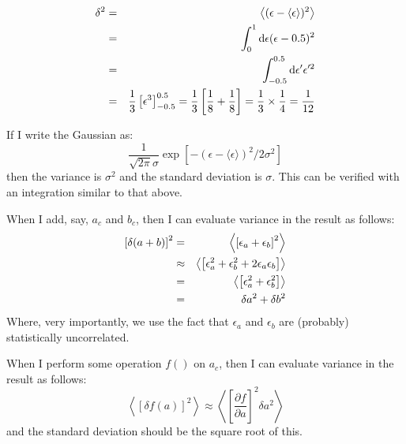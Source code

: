 
\begin{answer}
  \begin{eqnarray}
    \delta^2 &=& \left\langle (\epsilon - \langle\epsilon\rangle)^2
    \right\rangle \cr
    &=& \int_0^1 {\rm d}\epsilon  (\epsilon - 0.5)^2 \cr
    &=& \int_{-0.5}^{0.5} {\rm d}\epsilon'  \epsilon'^2 \cr
    &=& \frac{1}{3}\left[\epsilon^3\right]^{0.5}_{-0.5}
      = \frac{1}{3}\left[\frac{1}{8} + \frac{1}{8}\right]
        = \frac{1}{3} \times \frac{1}{4} = \frac{1}{12}
  \end{eqnarray}
\end{answer}


\begin{answer}
  If I write the Gaussian as:
  \begin{equation}
    \frac{1}{\sqrt{2\pi}\sigma} \exp\left[ -
      \left(\epsilon-\langle\epsilon\rangle\right)^2 / 2\sigma^2\right]
  \end{equation}
  then the variance is $\sigma^2$ and the standard deviation is
  $\sigma$. This can be verified with an integration similar to
  that above. 
\end{answer}

When I add, say, $a_c$ and $b_c$, then I can evaluate variance in the
result as follows:
\begin{eqnarray}
  \left[\delta(a+b)\right]^2 &=& \left\langle \left[\epsilon_a +
    \epsilon_b\right]^2 \right\rangle \cr
    &\approx& \left\langle \left[\epsilon_a^2 + \epsilon_b^2 + 2
      \epsilon_a \epsilon_b \right] \right\rangle \cr
    &=& \left\langle \left[\epsilon_a^2 + \epsilon_b^2 \right]
    \right\rangle\cr
    &=& \delta a^2 + \delta b^2
\end{eqnarray}
Where, very importantly, we use the fact that $\epsilon_a$ and
$\epsilon_b$ are (probably) statistically uncorrelated.

When I perform some operation $f()$ on $a_c$, then I can evaluate
variance in the result as follows:
\begin{equation}
\left\langle \left[\delta f(a)\right]^2 \right\rangle \approx 
\left\langle \left[\frac{\partial f}{\partial a}\right]^2 \delta a^2
\right\rangle
\end{equation}
and the standard deviation should be the square root of this.

